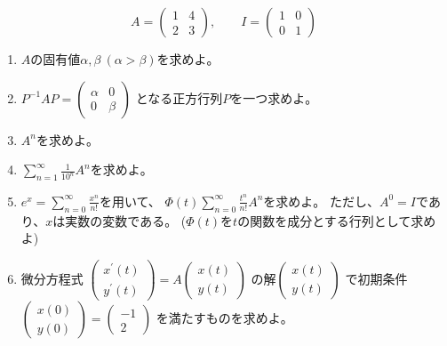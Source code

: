 \documentclass[12pt,b5paper]{ltjsarticle}
\begin{document}
\begin{equation}
 A=
  \begin{pmatrix} 1 & 4 \\ 2 & 3 \end{pmatrix},
  \qquad
 I=
  \begin{pmatrix} 1 & 0 \\ 0 & 1 \end{pmatrix}
\end{equation}

\begin{enumerate}
 \item
      $A$の固有値$\alpha,\beta \ (\alpha > \beta)$を求めよ。
 \item
      $P^{-1}AP=\begin{pmatrix} \alpha & 0 \\ 0 & \beta \end{pmatrix}$
      となる正方行列$P$を一つ求めよ。
 \item
      $A^n$を求めよ。
 \item
      $\sum_{n=1}^{\infty}\frac{1}{10^n}A^n$を求めよ。
 \item
      $e^x = \sum_{n=0}^{\infty}\frac{x^n}{n!}$を用いて、
      $\Phi (t)\sum_{n=0}^{\infty}\frac{t^n}{n!}A^n$を求めよ。
      ただし、$A^0=I$であり、$x$は実数の変数である。
      ($\Phi(t)$を$t$の関数を成分とする行列として求めよ)
 \item
      微分方程式
       $\begin{pmatrix} x^{\prime}(t)\\y^\prime(t) \end{pmatrix}=
      A\begin{pmatrix} x(t)\\y(t) \end{pmatrix}$
       の解$\begin{pmatrix} x(t)\\y(t) \end{pmatrix}$
      で初期条件
      $\begin{pmatrix} x(0)\\y(0) \end{pmatrix}=
      \begin{pmatrix} -1\\2 \end{pmatrix}$
      を満たすものを求めよ。
\end{enumerate}

\hrulefill
\end{document}
